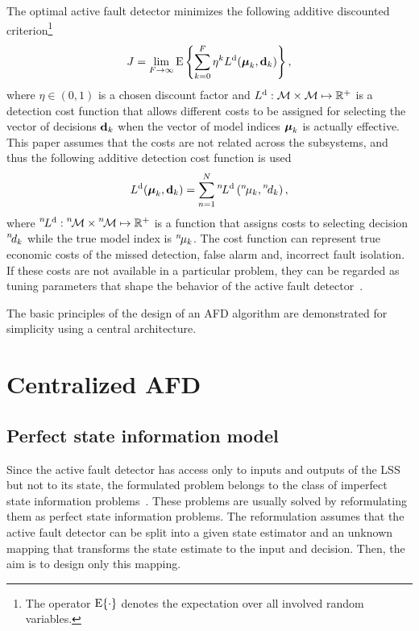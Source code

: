 \documentclass[conference,10pt]{IEEEtran}
\def\nth{\prescript{n\!}{}}
\begin{document}
The optimal active fault detector minimizes the following additive discounted criterion\footnote{The operator $\operatorname*{E}\{\cdot\}$ denotes the expectation over all involved random variables.}
\begin{align} \label{ali:criterion}
	J = \lim_{F\to\infty} \operatorname*{E} \left\{ \sum_{k=0}^{F} \eta^{k} L^{\mathrm{d}}(\boldsymbol{\mu}_{k},\mathbf{d}_{k})\right\},
\end{align}
where $\eta\in(0,1)$ is a chosen discount factor and $L^{\mathrm{d}}:\mathcal{M}\times\mathcal{M}\mapsto\mathbb{R}^{+}$ is a detection cost function that allows different costs to be assigned for selecting the vector of decisions $\mathbf{d}_{k}$ when the vector of model indices $\boldsymbol{\mu}_{k}$ is actually effective.
This paper assumes that the costs are not related across the subsystems, and thus the following additive detection cost function is used
\begin{align}
	L^{\mathrm{d}}(\bfmu_{k},\bfd_{k}) = \sum_{n=1}^{N} \nth{L}^{\mathrm{d}} \left(\nth{\mu}_{k},\nth{d}_{k} \right), \label{ali:additiveCostFunction}
\end{align}
where $\nth{L}^{\mathrm{d}}:\nth{\mcM}\times\nth{\mcM}\mapsto\bbR^{+}$ is a function that assigns costs to selecting decision $\nth{d}_{k}$ while the true model index is $\nth{\mu}_{k}$. 
The cost function can represent true economic costs of the missed detection, false alarm and, incorrect fault isolation. 
If these costs are not available in a particular problem, they can be regarded as tuning parameters that shape the behavior of the active fault detector~\cite{Puncochar2014:ja:AMCS}.

The basic principles of the design of an AFD algorithm are demonstrated for simplicity using a central architecture.
\section{Centralized AFD}\label{sec:centralized_afd}
\subsection{Perfect state information model}\label{sec:perfectStateInformationModel}
Since the active fault detector has access only to inputs and outputs of the LSS but not to its state, the formulated problem belongs to the class of imperfect state information problems~\cite{Bertsekas2012:b}. 
These problems are usually solved by reformulating them as perfect state information problems. 
The reformulation assumes that the active fault detector can be split into a given state estimator and an unknown mapping that transforms the state estimate to the input and decision. 
Then, the aim is to design only this mapping.
\end{document}
